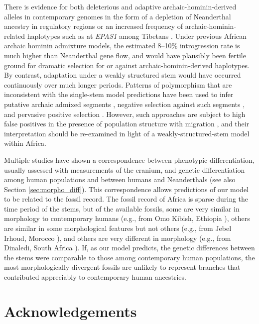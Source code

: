 \documentclass[]{article}
\begin{document}
There is evidence for both deleterious and adaptive archaic-hominin-derived alleles in
contemporary genomes in the form of a depletion of Neanderthal ancestry in regulatory
regions \citep{Petr2019-xo} or an increased frequency of archaic-hominin-related
haplotypes such as at \emph{EPAS1} among Tibetans \citep{Zhang2021-xx}. Under previous
African archaic hominin admixture models, the estimated 8--10\% introgression rate is
much higher than Neanderthal gene flow, and would have plausibly been fertile
ground for dramatic selection for or against archaic-hominin-derived haplotypes\citep{Wall2019-ao}. By contrast, adaptation under a weakly
structured stem would have occurred continuously over much longer periods.
Patterns of polymorphism that are inconsistent with the single-stem model
predictions have been used to infer putative archaic admixed segments
\citep{Plagnol2006-lt,Hsieh2016-gk,Wall2019-ao,Durvasula2020-td}, negative
selection against such segments \citep{Wall2019-ao}, and pervasive positive
selection \citep{Schrider2017-kl}. However, such approaches are subject to high
false positives in the presence of population structure with migration
\citep{Petr2019-xo}, and their interpretation should be re-examined in light of
a weakly-structured-stem model within Africa. 

Multiple studies have shown a correspondence between phenotypic
differentiation, usually assessed with measurements of the cranium, and genetic
differentiation among human populations and between humans and Neanderthals
\citep{Relethford1994-mh,Weaver2008-ho,Von_Cramon-Taubadel2009-zb}
(see also Section \ref{sec:morpho_diff}).
This correspondence allows predictions of our model to be related to the fossil record.
The fossil record of Africa is sparse during the time period of the stems, but of the
available fossils, some are very similar in morphology to contemporary humans
(e.g., from Omo Kibish, Ethiopia \citep{Day1969-rh,Vidal2022-qe}),
others are similar in some morphological features but not others
(e.g., from Jebel Irhoud, Morocco \citep{Hublin2017-cq,Richter2017-zu}),
and others are very different in morphology
(e.g., from Dinaledi, South Africa \citep{Berger2015-bq,Dirks2017-uk}).
If, as our model predicts, the
genetic differences between the stems were comparable to those among
contemporary human populations, the most morphologically divergent fossils are unlikely to
represent branches that contributed appreciably to contemporary human
ancestries.

\section*{Acknowledgements}
\end{document}
